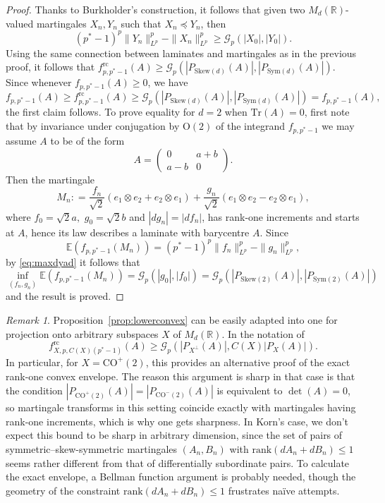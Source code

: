 \documentclass[11pt, a4paper]{amsart}
\theoremstyle{definition}
\theoremstyle{remark}
\newtheorem{remark}{Remark}
\newcommand{\R}{\mathbb{R}}
\begin{document}
\begin{proof}
Thanks to Burkholder's construction, it follows that
given two $M_d(\R)$-valued martingales
$X_n,Y_n$ such that
$X_n\preccurlyeq Y_n$, then
\begin{equation*}
    (p^*-1)^p\|Y_n\|_{L^p}^p-\|X_n\|_{L^p}^p\ge
    \mathcal G_p(|X_0|,|Y_0|).
\end{equation*}
Using the same connection between laminates
and martingales as in the previous
proof, it follows that 
$f_{p,p^*-1}^{\mathrm{rc}}(A)
\ge \mathcal G_p(|P_{\mathrm{Skew}(d)}(A)|,
|P_{\mathrm{Sym}(d)}(A)|)$.
Since whenever $f_{p,p^*-1}(A)\ge 0$, we have 
\begin{equation*}
f_{p,p^*-1}(A)\ge f_{p,p^*-1}^{\mathrm{rc}}(A)
\ge \mathcal G_p(|P_{\mathrm{Skew}(d)}(A)|,
|P_{\mathrm{Sym}(d)}(A)|)
=f_{p,p^*-1}(A),
\end{equation*}
the first claim follows.
To prove equality for $d=2$ when $\mathrm{Tr}(A)=0$,
first note that by invariance under conjugation by 
$\mathrm{O}(2)$ of the integrand $f_{p,p^*-1}$
we may assume
$A$ to be of the form 
\[A=\begin{pmatrix}0&a+b\\a-b&0\end{pmatrix}.\]
Then the martingale
\begin{equation*}
    M_n\mathrel{:}=
    \frac{f_n}{\sqrt 2}(e_1\otimes e_2+e_2\otimes e_1)+
    \frac{g_n}{\sqrt 2}(e_1\otimes e_2-e_2\otimes e_1),
\end{equation*}
where $f_0=\sqrt 2a,$ $g_0=\sqrt 2b$
and $|dg_n|=|df_n|$, has 
rank-one increments and starts at $A$, hence
its law describes a laminate with barycentre $A$. Since
\[
\mathbb E(f_{p,p^*-1}(M_n))=
(p^*-1)^p\|f_n\|_{L^p}^p-
\|g_n\|_{L^p}^p,
\]
by \eqref{eq:maxdyad} it follows that
\begin{equation*}
    \inf_{(f_n,g_n)}\mathbb E(f_{p,p^*-1}(M_n))
    =\mathcal G_p(|g_0|, |f_0|)=
    \mathcal G_p(|P_{\mathrm{Skew}(2)}(A)|,
    |P_{\mathrm{Sym}(2)}(A)|)
\end{equation*}
and the result is proved.
\end{proof}
\begin{remark}
Proposition~\ref{prop:lowerconvex} can be easily
adapted into one for projection onto 
arbitrary subspaces $X$ of $M_d(\R)$. In the
notation of \cite{Cassese2025}
\[f_{X,p,C(X)(p^*-1)}^{\mathrm{rc}}(A)
\ge \mathcal G_p(|P_{X^\perp}(A)|, C(X)|P_X(A)|)
.\]
In particular, for $X=\mathrm{CO}^+(2)$, 
this provides an alternative
proof of the exact rank-one convex envelope.
The reason this argument is sharp in that case
is that the condition
$|P_{\text{CO}^+(2)}(A)|=|P_{\text{CO}^-(2)}(A)|$
is equivalent to $\det(A)=0$, so martingale
transforms in this setting
coincide exactly with martingales
having rank-one increments, which is
why one gets sharpness.
In Korn's case, we don't expect this bound to be
sharp in arbitrary dimension, since
the set of pairs of symmetric--skew-symmetric 
martingales $(A_n,B_n)$ with 
$\mathrm{rank}(dA_n+dB_n)\le 1$ seems 
rather different from that of
differentially subordinate
pairs.
To calculate the exact envelope,
a Bellman function argument
is probably needed, though the geometry
of the constraint 
$\mathrm{rank}(dA_n+dB_n)\le 1$ frustrates
naïve attempts.
\end{remark}
\end{document}
